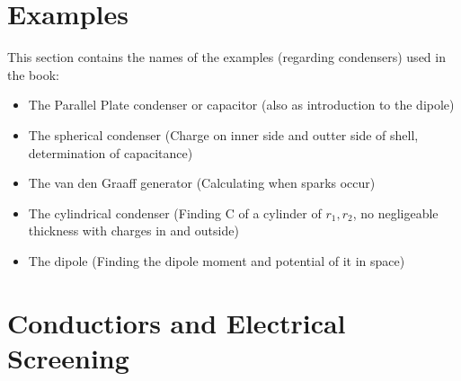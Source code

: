 \section{Examples}
This section contains the names of the examples (regarding condensers) used in the book:
\begin{itemize}
    \item The Parallel Plate condenser or capacitor (also as introduction to the dipole)
    \item The spherical condenser (Charge on inner side and outter side of shell, determination of capacitance)
    \item The van den Graaff generator (Calculating when sparks occur)
    \item The cylindrical condenser (Finding C of a cylinder of $r_1,r_2$, no negligeable thickness with charges in and outside)
    \item The dipole (Finding the dipole moment and potential of it in space)
\end{itemize}

\section{Conductiors and Electrical Screening}